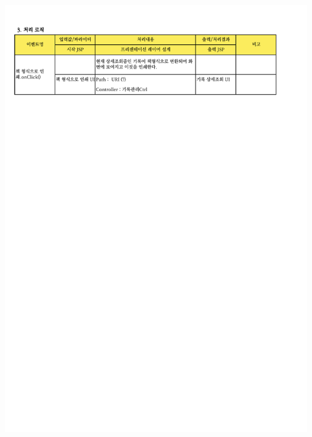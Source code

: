 {{{{{{{{{{{{{{{{{{{{{{{{{\includegraphics[width=20cm]{./Figure/Analysis/Display/diary/diary_24.pdf} \\
}}}}}}}}}}}}}}}}}}}}}}}}}
